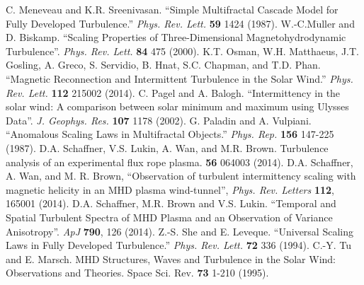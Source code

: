 \documentclass[preprint2]{aastex}
\begin{document}
\begin{thebibliography}{}
 C. Meneveau and K.R. Sreenivasan. ``Simple Multifractal Cascade Model for Fully Developed Turbulence.'' {\it Phys. Rev. Lett.} {\bf 59} 1424 (1987).
 W.-C.M$\ddot{\mathrm{u}}$ller and D. Biskamp. ``Scaling Properties of Three-Dimensional Magnetohydrodynamic Turbulence''. {\it Phys. Rev. Lett.} {\bf 84} 475 (2000).
 K.T. Osman, W.H. Matthaeus, J.T. Gosling, A. Greco, S. Servidio, B. Hnat, S.C. Chapman, and T.D. Phan. ``Magnetic Reconnection and Intermittent Turbulence in the Solar Wind.'' {\it Phys. Rev. Lett.} {\bf 112} 215002 (2014).
 C. Pagel and A. Balogh. ``Intermittency in the solar wind: A comparison between solar minimum and maximum using Ulysses Data''. {\it J. Geophys. Res.} {\bf 107} 1178 (2002).
 G. Paladin and A. Vulpiani. ``Anomalous Scaling Laws in Multifractal Objects.'' {\it Phys. Rep.} {\bf 156} 147-225 (1987).
 D.A. Schaffner, V.S. Lukin, A. Wan, and M.R. Brown. Turbulence analysis of an experimental flux rope plasma. {\bf 56} 064003 (2014).
 D.A. Schaffner, A. Wan, and M. R. Brown, ``Observation of turbulent intermittency scaling with magnetic helicity in an MHD plasma wind-tunnel'', {\it Phys. Rev. Letters} {\bf 112}, 165001 (2014).
 D.A. Schaffner, M.R. Brown and V.S. Lukin. ``Temporal and Spatial Turbulent Spectra of MHD Plasma and an Observation of Variance Anisotropy''. {\it ApJ} {\bf 790}, 126 (2014).
 Z.-S. She and E. Leveque. ``Universal Scaling Laws in Fully Developed Turbulence.'' {\it Phys. Rev. Lett.} {\bf 72} 336 (1994).
 C.-Y. Tu and E. Marsch. MHD Structures, Waves and Turbulence in the Solar Wind: Observations and Theories. Space Sci. Rev. {\bf 73} 1-210 (1995).
\end{thebibliography}
\end{document}
